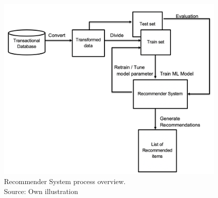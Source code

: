 \Par
\begin{figure}
    \centering
    \includegraphics[scale=0.5]{chapters/figures/recommender_system.png}
    \caption{Recommender System process overview. \\
    Source: Own illustration}
    \label{fig:recommender_system}
\end{figure}

\\
\Par

